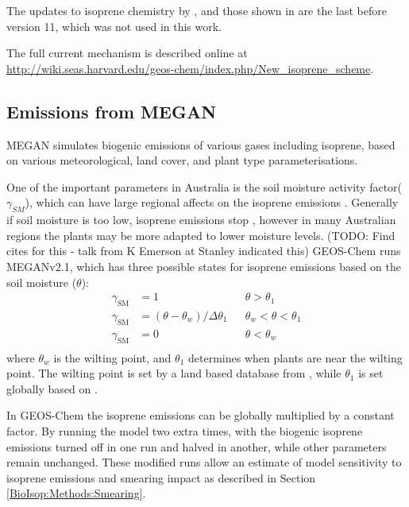     The updates to isoprene chemistry by \citet{Mao2013}, and those shown in \cite{Crounse2011,Crounse2012} are the last before version 11, which was not used in this work.
    
    The full current mechanism is described online at \url{http://wiki.seas.harvard.edu/geos-chem/index.php/New_isoprene_scheme}.

  \subsection{Emissions from MEGAN}
    \label{Model:GC_isop:MEGAN}
    MEGAN simulates biogenic emissions of various gases including isoprene, based on various meteorological, land cover, and plant type parameterisations.
    
    One of the important parameters in Australia is the soil moisture activity factor($\gamma_{SM}$), which can have large regional affects on the isoprene emissions \citep{Sindelarova2014,Bauwens2016}.
    Generally if soil moisture is too low, isoprene emissions stop \citep{Pegoraro2004,Niinemets2010}, however in many Australian regions the plants may be more adapted to lower moisture levels. (TODO: Find cites for this - talk from K Emerson at Stanley indicated this)
    GEOS-Chem runs MEGANv2.1, which has three possible states for isoprene emissions based on the soil moisture ($\theta$):
    \begin{align*}
      \gamma_\mathrm{SM} & = 1 && \theta > \theta_1 \\
      \gamma_\mathrm{SM} & = (\theta-\theta_w)/\Delta\theta_1  && \theta_w < \theta < \theta_1 \\
      \gamma_\mathrm{SM} & = 0 && \theta < \theta_w \\
    \end{align*}
    where $\theta_w$ is the wilting point, and $\theta_1$ determines when plants are near the wilting point.
    The wilting point is set by a land based database from \citet{Chen2001}, while $\theta_1$ is set globally based on \citet{Pegoraro2004}.
    
    In GEOS-Chem the isoprene emissions can be globally multiplied by a constant factor.
    By running the model two extra times, with the biogenic isoprene emissions turned off in one run and halved in another, while other parameters remain unchanged. 
    These modified runs allow an estimate of model sensitivity to isoprene emissions and smearing impact as described in Section \ref{BioIsop:Methods:Smearing}.
    
